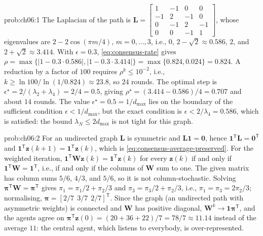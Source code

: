 \begin{sol}{prob:ch06:1}
The Laplacian of the path is
$\mathbf{L}=\begin{bmatrix}1&-1&0&0\\-1&2&-1&0\\0&-1&2&-1\\0&0&-1&1\end{bmatrix}$,
whose eigenvalues are $2-2\cos(\pi m/4)$, $m=0,\dots,3$, i.e., $0$, $2-\sqrt{2}\approx0.586$, $2$, and $2+\sqrt{2}\approx3.414$. With $\epsilon=0.3$, \eqref{eq:consensus-rate} gives $\rho=\max\{|1-0.3\cdot0.586|,|1-0.3\cdot3.414|\}=\max\{0.824,0.024\}=0.824$. A reduction by a factor of $100$ requires $\rho^{k}\le10^{-2}$, i.e., $k\ge\ln 100/\ln(1/0.824)\approx23.8$, so $24$ rounds. The optimal step is $\epsilon^{\star}=2/(\lambda_2+\lambda_4)=2/4=0.5$, giving $\rho^{\star}=(3.414-0.586)/4=0.707$ and about $14$ rounds. The value $\epsilon^{\star}=0.5=1/d_{\max}$ lies on the boundary of the sufficient condition $\epsilon<1/d_{\max}$, but the exact condition is $\epsilon<2/\lambda_4=0.586$, which is satisfied: the bound $\lambda_N\le2d_{\max}$ is not tight for this graph.
\end{sol}

\begin{sol}{prob:ch06:2}
For an undirected graph $\mathbf{L}$ is symmetric and $\mathbf{L}\mathbf{1}=\mathbf{0}$, hence $\mathbf{1}^{\mathsf T}\mathbf{L}=\mathbf{0}^{\mathsf T}$ and $\mathbf{1}^{\mathsf T}\mathbf{z}(k+1)=\mathbf{1}^{\mathsf T}\mathbf{z}(k)$, which is \eqref{eq:consensus-average-preserved}. For the weighted iteration, $\mathbf{1}^{\mathsf T}\mathbf{W}\mathbf{z}(k)=\mathbf{1}^{\mathsf T}\mathbf{z}(k)$ for every $\mathbf{z}(k)$ if and only if $\mathbf{1}^{\mathsf T}\mathbf{W}=\mathbf{1}^{\mathsf T}$, i.e., if and only if the columns of $\mathbf{W}$ sum to one. The given matrix has column sums $5/6$, $4/3$, and $5/6$, so it is not column-stochastic. Solving $\boldsymbol{\pi}^{\mathsf T}\mathbf{W}=\boldsymbol{\pi}^{\mathsf T}$ gives $\pi_1=\pi_1/2+\pi_2/3$ and $\pi_3=\pi_3/2+\pi_2/3$, i.e., $\pi_1=\pi_3=2\pi_2/3$; normalising, $\boldsymbol{\pi}=[2/7\ \ 3/7\ \ 2/7]^{\mathsf T}$. Since the graph (an undirected path with asymmetric weights) is connected and $\mathbf{W}$ has positive diagonal, $\mathbf{W}^{k}\to\mathbf{1}\boldsymbol{\pi}^{\mathsf T}$, and the agents agree on $\boldsymbol{\pi}^{\mathsf T}\mathbf{z}(0)=(20+36+22)/7=78/7\approx11.14$ instead of the average $11$: the central agent, which listens to everybody, is over-represented.
\end{sol}

